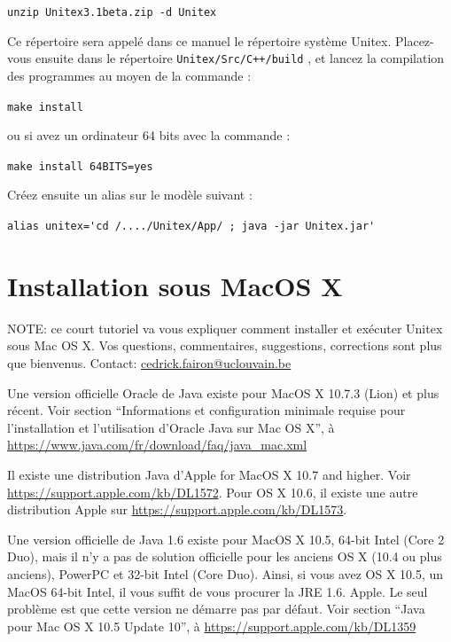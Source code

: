 \bigskip \noindent \verb$unzip Unitex3.1beta.zip -d Unitex$

\bigskip
\noindent Ce répertoire sera appelé dans ce manuel le répertoire système Unitex.
Placez-vous ensuite dans le répertoire \verb|Unitex/Src/C++/build|   , et lancez la compilation des
programmes au moyen de la commande :


\bigskip \verb+make install+

\bigskip
\noindent ou si avez un ordinateur 64 bits avec la commande :
 
\bigskip \verb+make install 64BITS=yes+

\bigskip
\noindent Créez ensuite un alias sur le modèle suivant :

\bigskip \verb$alias unitex='cd /..../Unitex/App/ ; java -jar Unitex.jar'$


\section{Installation sous MacOS X}
\label{section-macos-install}
\noindent NOTE: ce court tutoriel va vous expliquer comment installer et exécuter Unitex sous Mac OS
X. Vos questions, commentaires, suggestions,
corrections sont plus que bienvenus.
\noindent Contact: \url{cedrick.fairon@uclouvain.be}


\bigskip
\noindent Une version officielle Oracle de Java existe pour MacOS X 10.7.3 (Lion) et plus récent.
	Voir section ``Informations et configuration minimale requise pour l'installation et l'utilisation d'Oracle Java sur Mac OS X'', à \url{https://www.java.com/fr/download/faq/java_mac.xml}

	

\bigskip
\noindent Il existe une distribution Java d'Apple for MacOS X 10.7 and higher.
	Voir \url{https://support.apple.com/kb/DL1572}. Pour OS X 10.6, il existe une autre distribution Apple sur \url{https://support.apple.com/kb/DL1573}.


\bigskip
\noindent Une version officielle de Java 1.6 existe pour MacOS X 10.5, 64-bit Intel 
(Core 2 Duo), mais il n'y a pas de solution officielle pour les anciens OS X (10.4 ou plus anciens),
PowerPC et 32-bit Intel (Core Duo). Ainsi,
 si vous avez OS X 10.5, un MacOS 64-bit Intel, il vous suffit de vous procurer
	la JRE 1.6. Apple. Le seul problème est que cette version ne démarre pas par défaut.
	Voir section ``Java pour Mac OS X 10.5 Update 10'', à \url{https://support.apple.com/kb/DL1359}


